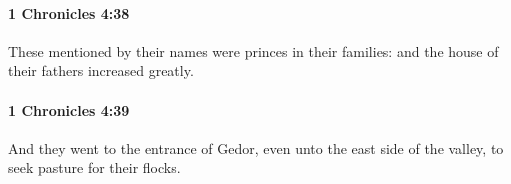 		\paragraph{1 Chronicles 4:38} %
			\label{1CHRONICLES-4-38}

			These mentioned by their names were princes in their families: and the house of their fathers increased greatly.


		\paragraph{1 Chronicles 4:39} %
			\label{1CHRONICLES-4-39}

			And they went to the entrance of Gedor, even unto the east side of the valley, to seek pasture for their flocks.


